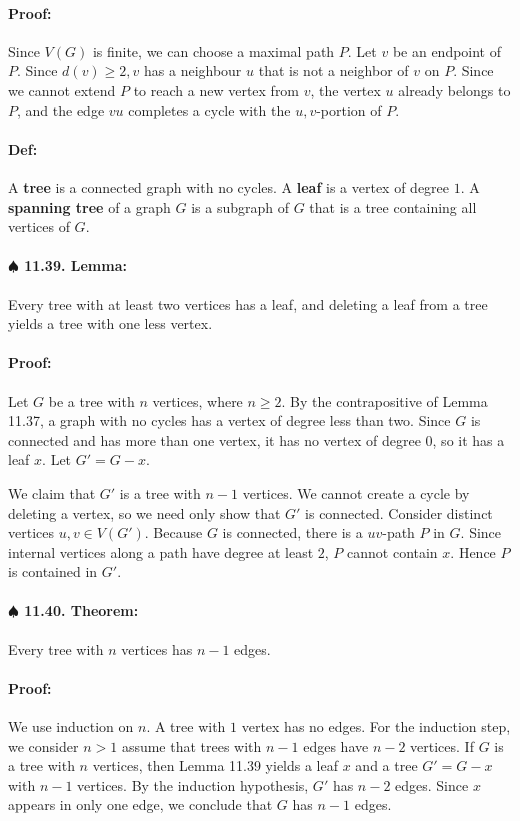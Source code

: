 \documentclass[a4paper, 11pt, twoside]{article}
\begin{document}
\paragraph{Proof:} Since $V(G)$ is finite, we can choose a maximal path $P$. Let $v$ be an endpoint of $P$. Since $d(v)\geq 2, v$ has a neighbour $u$ that is not a neighbor of $v$ on $P$. Since we cannot extend $P$ to reach a new vertex from $v$, the vertex $u$ already belongs to $P$, and the edge $vu$ completes a cycle with the $u,v$-portion of $P$.

\paragraph{Def:} A \textbf{tree} is a connected graph with no cycles. A \textbf{leaf} is a vertex of degree $1$. A \textbf{spanning tree} of a graph $G$ is a subgraph of $G$ that is a tree containing all vertices of $G$.

\paragraph{$\spadesuit$ 11.39. Lemma:} Every tree with at least two vertices has a leaf, and deleting a leaf from a tree yields a tree with one less vertex.

\paragraph{Proof:} Let $G$ be a tree with $n$ vertices, where $n\geq  2$. By the contrapositive of Lemma 11.37, a graph with no cycles has a vertex of degree less than two. Since $G$ is connected and has more than one vertex, it has no vertex of degree $0$, so it has a leaf $x$. Let $G'=G-x$.

We claim that $G'$ is a tree with $n-1$ vertices. We cannot create a cycle by deleting a vertex, so we need only show that $G'$ is connected. Consider distinct vertices $u,v\in V(G')$. Because $G$ is connected, there is a $uv$-path $P$ in $G$. Since internal vertices along a path have degree at least $2$, $P$ cannot contain $x$. Hence $P$ is contained in $G'$.

\paragraph{$\spadesuit$ 11.40. Theorem:} Every tree with $n$ vertices has $n-1$ edges.

\paragraph{Proof:} We use induction on $n$. A tree with $1$ vertex has no edges. For the induction step, we consider $n>1$ assume that trees with $n-1$ edges have $n-2$ vertices. If $G$ is a tree with $n$ vertices, then Lemma 11.39 yields a leaf $x$ and a tree $G'=G-x$ with $n-1$ vertices. By the induction hypothesis, $G'$ has $n-2$ edges. Since $x$ appears in only one edge, we conclude that $G$ has $n-1$ edges.
\end{document}
